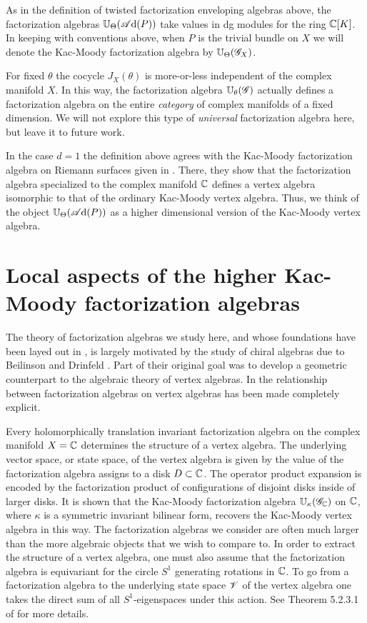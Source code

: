 \documentclass[10pt]{amsart}
\def\sAd{\sA{\rm d}}
\begin{document}
\begin{rmk} 
As in the definition of twisted factorization enveloping algebras above, the factorization algebras $\UU_\Theta(\sAd(P))$ take values in dg modules for the ring $\mathbb C[K]$. 
In keeping with conventions above, when $P$ is the trivial bundle on $X$ we will denote the Kac-Moody factorization algebra by $\mathbb U_\Theta(\mathscr G_X)$. 
\end{rmk}

\begin{rmk}
For fixed $\theta$ the cocycle $J_X(\theta)$ is more-or-less independent of the complex manifold $X$.
In this way, the factorization algebra $\mathbb U_\theta (\mathscr G)$ actually defines a factorization algebra on the entire {\em category} of complex manifolds of a fixed dimension.
We will not explore this type of {\em universal} factorization algebra here, but leave it to future work.
\end{rmk}

In the case $d = 1$ the definition above agrees with the Kac-Moody factorization algebra on Riemann surfaces given in \cite{CG1}.
There, they show that the factorization algebra specialized to the complex manifold $\mathbb C$ defines a vertex algebra isomorphic to that of the ordinary Kac-Moody vertex algebra.
Thus, we think of the object $\UU_\Theta(\sAd(P))$ as a higher dimensional version of the Kac-Moody vertex algebra.

\section{Local aspects of the higher Kac-Moody factorization algebras} 
\label{sec: sphere ops}

The theory of factorization algebras we study here, and whose foundations have been layed out in \cite{CG1}, is largely motivated by the study of chiral algebras due to Beilinson and Drinfeld \cite{BD}.
Part of their original goal was to develop a geometric counterpart to the algebraic theory of vertex algebras. 
In \cite{CG1} the relationship between factorization algebras on vertex algebras has been made completely explicit. 

Every holomorphically translation invariant factorization algebra on the complex manifold $X = \mathbb C$ determines the structure of a vertex algebra.
The underlying vector space, or state space, of the vertex algebra is given by the value of the factorization algebra assigns to a disk $D \subset \mathbb C$. 
The operator product expansion is encoded by the factorization product of configurations of disjoint disks inside of larger disks. 
It is shown that the Kac-Moody factorization algebra $\mathbb U_{\kappa}(\mathscr G_\mathbb C)$ on $\mathbb C$, where $\kappa$ is a symmetric invariant bilinear form, recovers the Kac-Moody vertex algebra in this way. 
The factorization algebras we consider are often much larger than the more algebraic objects that we wish to compare to. 
In order to extract the structure of a vertex algebra, one must also assume that the factorization algebra is equivariant for the circle $S^1$ generating rotations in $\mathbb C$. 
To go from a factorization algebra to the underlying state space $\mathscr V$ of the vertex algebra one takes the direct sum of all $S^1$-eigenspaces under this action. 
See Theorem 5.2.3.1 of \cite{CG1} for more details.
\end{document}
